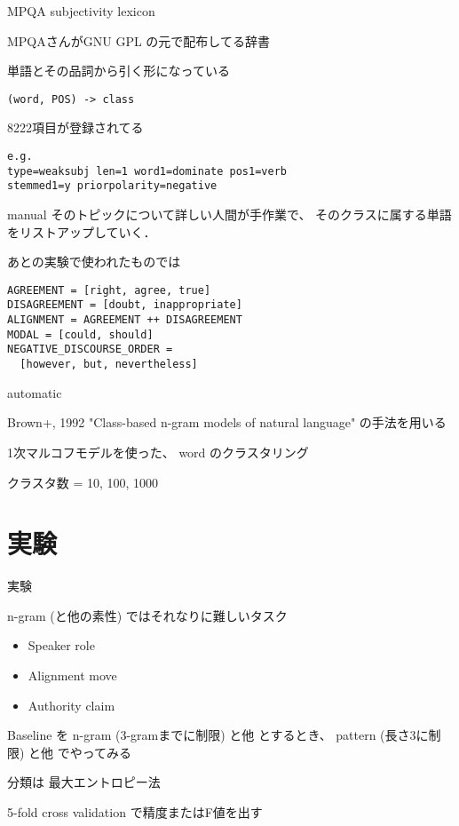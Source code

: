\documentclass[12pt, dvipdfmx, default, cjk]{beamer}
\begin{document}
\begin{frame}[fragile]{MPQA subjectivity lexicon}

  MPQAさんがGNU GPL の元で配布してる辞書

  単語とその品詞から引く形になっている

\begin{verbatim}
(word, POS) -> class
\end{verbatim}

8222項目が登録されてる

\begin{verbatim}
e.g.
type=weaksubj len=1 word1=dominate pos1=verb
stemmed1=y priorpolarity=negative
\end{verbatim}

\end{frame}

\begin{frame}[fragile]{manual}
  そのトピックについて詳しい人間が手作業で、
  そのクラスに属する単語をリストアップしていく．

  あとの実験で使われたものでは

  \begin{verbatim}
AGREEMENT = [right, agree, true]
DISAGREEMENT = [doubt, inappropriate]
ALIGNMENT = AGREEMENT ++ DISAGREEMENT
MODAL = [could, should]
NEGATIVE_DISCOURSE_ORDER =
  [however, but, nevertheless]
  \end{verbatim}

\end{frame}

\begin{frame}{automatic}

Brown+, 1992
"Class-based n-gram models of natural language"
の手法を用いる

1次マルコフモデルを使った、
word のクラスタリング

クラスタ数 = 10, 100, 1000

\end{frame}

\section{実験}

\begin{frame}{実験}

  n-gram (と他の素性) ではそれなりに難しいタスク

  \begin{itemize}
    \item Speaker role
    \item Alignment move
    \item Authority claim
  \end{itemize}

  Baseline を n-gram (3-gramまでに制限) と他
  とするとき、
  pattern (長さ3に制限) と他
  でやってみる

  分類は 最大エントロピー法

  5-fold cross validation で精度またはF値を出す
\end{frame}
\end{document}
